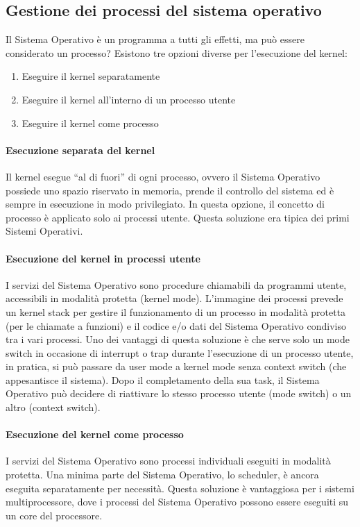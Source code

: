 \documentclass[a4]{article}
\begin{document}
\subsection{Gestione dei processi del sistema operativo}
Il Sistema Operativo è un programma a tutti gli effetti, ma può essere considerato un processo? Esistono tre opzioni diverse per l'esecuzione del kernel:
\begin{enumerate}
    \item Eseguire il kernel separatamente
    \item Eseguire il kernel all'interno di un processo utente
    \item Eseguire il kernel come processo
\end{enumerate}

\paragraph{Esecuzione separata del kernel} Il kernel esegue ``al di fuori'' di ogni processo, ovvero il Sistema Operativo possiede uno spazio riservato in memoria, prende il controllo del sistema ed è sempre in esecuzione in modo privilegiato. In questa opzione, il concetto di processo è applicato solo ai processi utente. Questa soluzione era tipica dei primi Sistemi Operativi.

\paragraph{Esecuzione del kernel in processi utente} I servizi del Sistema Operativo sono procedure chiamabili da programmi utente, accessibili in modalità protetta (kernel mode). L'immagine dei processi prevede un kernel stack per gestire il funzionamento di un processo in modalità protetta (per le chiamate a funzioni) e il codice e/o dati del Sistema Operativo condiviso tra i vari processi.
Uno dei vantaggi di questa soluzione è che serve solo un mode switch in occasione di interrupt o trap durante l'esecuzione di un processo utente, in pratica, si può passare da user mode a kernel mode senza context switch (che appesantisce il sistema). Dopo il completamento della sua task, il Sistema Operativo può decidere di riattivare lo stesso processo utente (mode switch) o un altro (context switch).

\paragraph{Esecuzione del kernel come processo} I servizi del Sistema Operativo sono processi individuali eseguiti in modalità protetta. Una minima parte del Sistema Operativo, lo scheduler, è ancora eseguita separatamente per necessità.
Questa soluzione è vantaggiosa per i sistemi multiprocessore, dove i processi del Sistema Operativo possono essere eseguiti su un core del processore.
\end{document}
